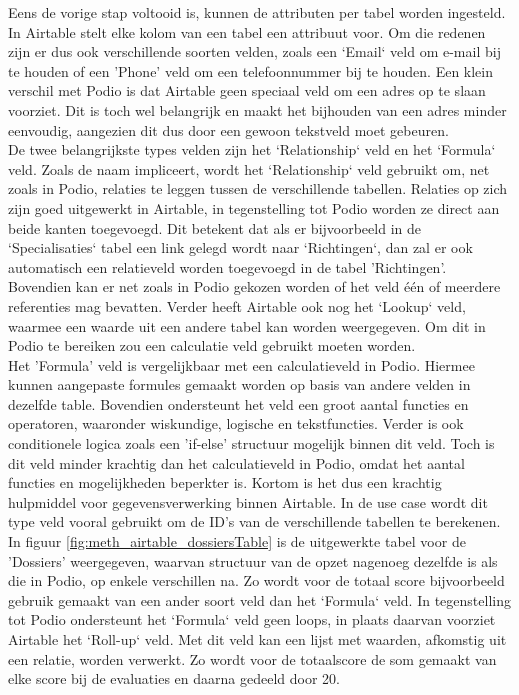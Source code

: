 Eens de vorige stap voltooid is, kunnen de attributen per tabel worden ingesteld. In Airtable stelt elke kolom van een tabel een attribuut voor. Om die redenen zijn er dus ook verschillende soorten velden, zoals een `Email` veld om e-mail bij te houden of een 'Phone' veld om een telefoonnummer bij te houden. Een klein verschil met Podio is dat Airtable geen speciaal veld om een adres op te slaan voorziet. Dit is toch wel belangrijk en maakt het bijhouden van een adres minder eenvoudig, aangezien dit dus door een gewoon tekstveld moet gebeuren. \\

De twee belangrijkste types velden zijn het `Relationship` veld en het `Formula` veld. Zoals de naam impliceert, wordt het `Relationship` veld gebruikt om, net zoals in Podio, relaties te leggen tussen de verschillende tabellen. Relaties op zich zijn goed uitgewerkt in Airtable, in tegenstelling tot Podio worden ze direct aan beide kanten toegevoegd. Dit betekent dat als er bijvoorbeeld in de `Specialisaties` tabel een link gelegd wordt naar `Richtingen`, dan zal er ook automatisch een relatieveld worden toegevoegd in de tabel 'Richtingen'. Bovendien kan er net zoals in Podio gekozen worden of het veld één of meerdere referenties mag bevatten. Verder heeft Airtable ook nog het `Lookup` veld, waarmee een waarde uit een andere tabel kan worden weergegeven. Om dit in Podio te bereiken zou een calculatie veld gebruikt moeten worden. \\

Het 'Formula' veld is vergelijkbaar met een calculatieveld in Podio. Hiermee kunnen aangepaste formules gemaakt worden op basis van andere velden in dezelfde table. Bovendien ondersteunt het veld een groot aantal functies en operatoren, waaronder wiskundige, logische en tekstfuncties. Verder is ook conditionele logica zoals een 'if-else' structuur mogelijk binnen dit veld. Toch is dit veld minder krachtig dan het calculatieveld in Podio, omdat het aantal functies en mogelijkheden beperkter is. Kortom is het dus een krachtig hulpmiddel voor gegevensverwerking binnen Airtable.  In de use case wordt dit type veld vooral gebruikt om de ID's van de verschillende tabellen te berekenen. \\

In figuur \ref{fig:meth_airtable_dossiersTable} is de uitgewerkte tabel voor de 'Dossiers' weergegeven, waarvan structuur van de opzet nagenoeg dezelfde is als die in Podio, op enkele verschillen na. Zo wordt voor de totaal score bijvoorbeeld gebruik gemaakt van een ander soort veld dan het `Formula` veld. In tegenstelling tot Podio ondersteunt het `Formula` veld geen loops, in plaats daarvan voorziet Airtable het `Roll-up` veld. Met dit veld kan een lijst met waarden, afkomstig uit een relatie, worden verwerkt. Zo wordt voor de totaalscore de som gemaakt van elke score bij de evaluaties en daarna gedeeld door 20. \\ 

